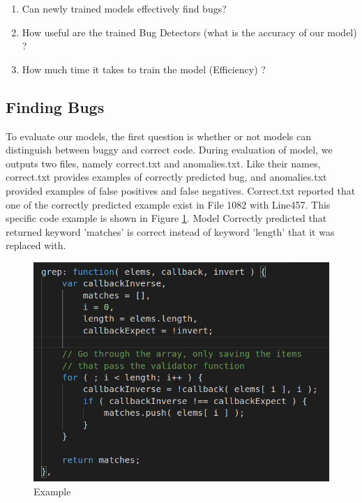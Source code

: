 \documentclass[sigconf]{acmart}
\begin{document}
\begin{enumerate}
\item Can newly trained models effectively find bugs?
\item How useful are the trained Bug Detectors (what is the accuracy of our model) ?
\item How much time it takes to train the model (Efficiency) ?
\end{enumerate}



\subsection{Finding Bugs}
To evaluate our models, the first question is whether or not models can distinguish between buggy and correct code. During evaluation of model, we outputs two files, namely correct.txt and anomalies.txt. Like their names, correct.txt provides examples of correctly predicted bug, and anomalies.txt provided examples of false positives and false negatives. Correct.txt reported that one of the correctly predicted example exist in File 1082 with Line457. This specific code example is shown in Figure \ref{fig:incorrect example}. Model Correctly predicted that returned keyword 'matches' is correct instead of keyword  'length' that it was replaced with. 

  \begin{figure}[!ht]    \includegraphics[width=\linewidth]{correctly predicted example return statement.png}
    \caption{Example}\label{fig:incorrect example}
  \end{figure}
\end{document}
